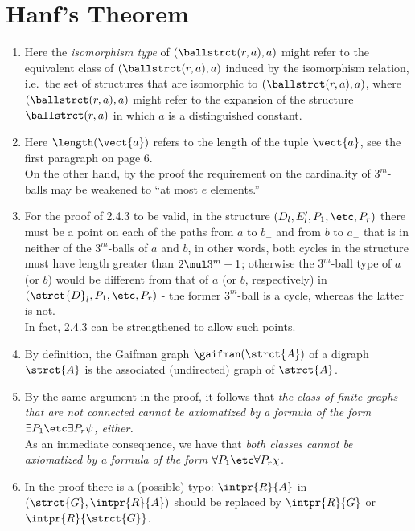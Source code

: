 \section{Hanf's Theorem}
\begin{enumerate}[1.]
%
\item {} Here the \emph{isomorphism type} of $(\ballstrct(r, a), a)$ might refer to the equivalent class of $(\ballstrct(r, a), a)$ induced by the isomorphism relation, i.e.\ the set of structures that are isomorphic to $(\ballstrct(r, a), a)$, where $(\ballstrct(r, a), a)$ might refer to the expansion of the structure $\ballstrct(r, a)$ in which $a$ is a distinguished constant.
%
\item {} Here $\length(\vect{a})$ refers to the length of the tuple $\vect{a}$, see the first paragraph on page 6.
\medskip\\
On the other hand, by the proof the requirement on the cardinality of $3^m$-balls may be weakened to ``at most $e$ elements.''
%
\item {} For the proof of 2.4.3 to be valid, in the structure $(D_l, E^\prime_l, P_1, \etc, P_r)$ there must be a point on each of the paths from $a$ to $b_-$ and from $b$ to $a_-$ that is in neither of the $3^m$-balls of $a$ and $b$, in other words, both cycles in the structure must have length greater than $2 \mul 3^m + 1$; otherwise the $3^m$-ball type of $a$ (or $b$) would be different from that of $a$ (or $b$, respectively) in $(\strct{D}_l, P_1, \etc, P_r)$ - the former $3^m$-ball is a cycle, whereas the latter is not.
\medskip\\
In fact, 2.4.3 can be strengthened to allow such points.
%
\item {} By definition, the Gaifman graph $\gaifman(\strct{A})$ of a digraph $\strct{A}$ is the associated (undirected) graph of $\strct{A}$.
%
\item {} By the same argument in the proof, it follows that \emph{the class of finite graphs that are not connected cannot be axiomatized by a formula of the form $\exists P_1 \etc \exists P_r \psi$, either.}
\medskip\\
As an immediate consequence, we have that \emph{both classes cannot be axiomatized by a formula of the form $\forall P_1 \etc \forall P_r \chi$.}
%
\item {} In the proof there is a (possible) typo: $\intpr{R}{A}$ in $(\strct{G}, \intpr{R}{A})$ should be replaced by $\intpr{R}{G}$ or $\intpr{R}{\strct{G}}$.

\end{enumerate}
